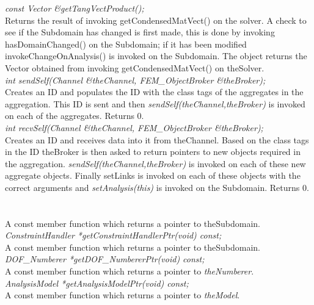 {{\em const Vector \&getTangVectProduct();}\\
Returns the result of invoking getCondensedMatVect() on the
solver. A check to see if the Subdomain has changed is first made, 
this is done by invoking hasDomainChanged() on the Subdomain; if it has 
been modified invokeChangeOnAnalysis() is invoked on the \p Subdomain. 
The object returns the Vector obtained from invoking getCondensedMatVect() 
on \p theSolver. \\


{\em int sendSelf(Channel \&theChannel, FEM\_ObjectBroker \&theBroker);}\\
Creates an ID and populates the ID with the class tags of the aggregates in
the aggregation. This ID is sent and then {\em sendSelf(theChannel,theBroker)} is
invoked on each of the aggregates. Returns 0.\\

{\em int recvSelf(Channel \&theChannel, FEM\_ObjectBroker \&theBroker);}\\
Creates an ID and receives data into it from \p theChannel. Based on the
class tags in the ID \p theBroker is then asked to return pointers to
new objects required in the aggregation.  {\em sendSelf(theChannel,theBroker)} is
invoked on each of these new aggregate objects. Finally \p setLinks is
invoked on each of these objects with the correct arguments and {\em setAnalysis(this)} 
is invoked on the \p Subdomain.  Returns 0.\\


  \\
 \\
A const member function which returns a pointer to \p theSubdomain. \\

{\em ConstraintHandler *getConstraintHandlerPtr(void) const;}\\
A const member function which returns a pointer to \p theSubdomain.\\

{\em DOF\_Numberer *getDOF\_NumbererPtr(void) const;}\\
A const member function which returns a pointer to {\em
theNumberer}.\\

{\em AnalysisModel  *getAnalysisModelPtr(void) const;}\\
A const member function which returns a pointer to {\em
theModel}.\\

}

